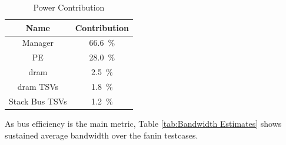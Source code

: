 \documentclass[journal]{IEEEtran}
\begin{document}
\begin{table}[h]
\begin{subtable}{0.5\textwidth}
\begin{adjustbox}{width=0.55\textwidth}
\begin{tabular}{cc}
            Name         & Contribution                             \\  %
        \hline  %
                Manager  & \SI[per-mode=symbol]{66.6}{\percent}  \\ 
                     PE  & \SI[per-mode=symbol]{28.0}{\percent}  \\
                   \ac{dram}  & \SI[per-mode=symbol]{ 2.5}{\percent}  \\
              \ac{dram} TSVs  & \SI[per-mode=symbol]{ 1.8}{\percent}  \\
         Stack Bus TSVs  & \SI[per-mode=symbol]{ 1.2}{\percent}  \\
        \bottomrule
      \end{tabular}
    \end{adjustbox}
    \vspace{3pt}
    \captionsetup{justification=centering, skip=10pt}
    \caption{Power Contribution}
    \label{tab:Power Dissipation}
  \end{subtable}
  \end{table}

As bus efficiency is the main metric, Table \ref{tab:Bandwidth Estimates} shows sustained average bandwidth over the fanin testcases.
\end{document}
